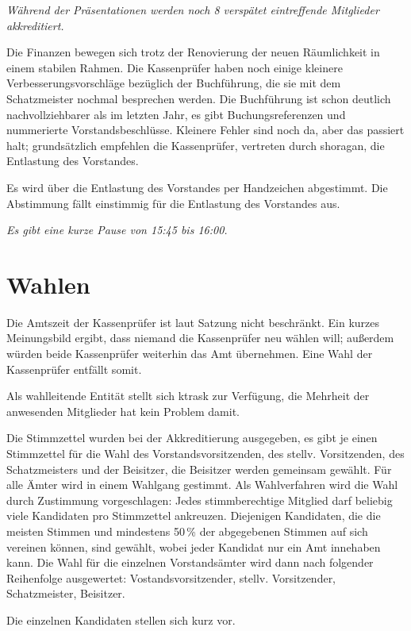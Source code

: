 \documentclass[a4paper,12pt]{scrartcl}
\begin{document}
\emph{Während der Präsentationen werden noch 8 verspätet eintreffende
  Mitglieder akkreditiert.}

Die Finanzen bewegen sich trotz der Renovierung der neuen Räumlichkeit in einem
stabilen Rahmen. Die Kassenprüfer haben noch einige kleinere
Verbesserungsvorschläge bezüglich der Buchführung, die sie mit dem Schatzmeister
nochmal besprechen werden. Die Buchführung ist schon deutlich
nachvollziehbarer als im letzten Jahr, es gibt Buchungsreferenzen und
nummerierte Vorstandsbeschlüsse. Kleinere Fehler sind noch da, aber das passiert
halt; grundsätzlich empfehlen die Kassenprüfer, vertreten durch shoragan, die
Entlastung des Vorstandes.

Es wird über die Entlastung des Vorstandes per Handzeichen abgestimmt. Die
Abstimmung fällt einstimmig für die Entlastung des Vorstandes aus.

\emph{Es gibt eine kurze Pause von 15:45 bis 16:00.}

\section{Wahlen}
Die Amtszeit der Kassenprüfer ist laut Satzung nicht beschränkt. Ein kurzes
Meinungsbild ergibt, dass niemand die Kassenprüfer neu wählen will; außerdem
würden beide Kassenprüfer weiterhin das Amt übernehmen. Eine Wahl der
Kassenprüfer entfällt somit.

Als wahlleitende Entität stellt sich ktrask zur Verfügung, die Mehrheit der
anwesenden Mitglieder hat kein Problem damit.

Die Stimmzettel wurden bei der Akkreditierung ausgegeben, es gibt je einen
Stimmzettel für die Wahl des Vorstandsvorsitzenden, des stellv. Vorsitzenden,
des Schatzmeisters und der Beisitzer, die Beisitzer werden gemeinsam gewählt.
Für alle Ämter wird in einem Wahlgang gestimmt.  Als Wahlverfahren wird die Wahl
durch Zustimmung vorgeschlagen: Jedes stimmberechtige Mitglied darf beliebig
viele Kandidaten pro Stimmzettel ankreuzen. Diejenigen Kandidaten, die die
meisten Stimmen und mindestens 50\,\% der abgegebenen Stimmen auf sich vereinen
können, sind gewählt, wobei jeder Kandidat nur ein Amt innehaben kann. Die Wahl
für die einzelnen Vorstandsämter wird dann nach folgender Reihenfolge
ausgewertet: Vostandsvorsitzender, stellv. Vorsitzender, Schatzmeister,
Beisitzer.

Die einzelnen Kandidaten stellen sich kurz vor.
\end{document}
